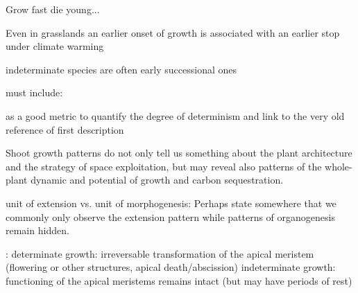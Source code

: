 \documentclass{article}
\begin{document}
 Grow fast die young...
 
 Even in grasslands an earlier onset of growth is associated with an earlier stop under climate warming \cite{mohlGrowthAlpineGrassland2022a}
	
indeterminate species are often early successional ones \citep{marksRelationExtensionGrowth1975, boojhGrowthStrategyTrees1982}

	
	must include: 
	
	\cite{iwasaOptimalGrowthSchedule1989}
	
	\cite{damascosBudCompositionBranching2005} as a good metric to quantify the degree of determinism and link to the very old reference of first description \cite{mooreStudyWinterBuds1909}
	
	\cite{guedonRelativeExtentsPreformation2006}
	
	
	Shoot growth patterns do not only tell us something about the plant architecture and the strategy of space exploitation, but may reveal also patterns of the whole-plant dynamic and potential of growth and carbon sequestration.
	
	unit of extension vs. unit of morphogenesis: Perhaps state somewhere that we commonly only observe the extension pattern while patterns of organogenesis remain hidden. 
	
	\cite{barthelemyPlantArchitectureDynamic2007}: determinate growth: irreversable transformation of the apical meristem (flowering or other structures, apical death/abscission)
	indeterminate growth: functioning of the apical meristems remains intact (but may have periods of rest)
	 
	
	\newpage
	
	
	
	
	
	
\end{document}
